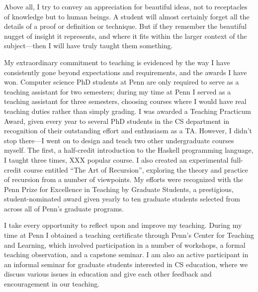 \documentclass{article}
\begin{document}

Above all, I try to convey an appreciation for beautiful ideas,
not to receptacles of knowledge but to human beings. A student will
almost certainly forget all the details of a proof or definition or
technique.  But if they remember the beautiful nugget of insight it
represents, and where it fits within the larger context of the
subject---then I will have truly taught them something.

% 

My extraordinary commitment to teaching is evidenced by the way I have
consistently gone beyond expectations and requirements, and the awards
I have won.  Computer science PhD students at Penn are only required
to serve as a teaching assistant for two semesters; during my time at
Penn I served as a teaching assistant for three semesters, choosing
courses where I would have real teaching duties rather than simply
grading.  I was awarded a Teaching Practicum Award, given every year
to several PhD students in the CS department in recognition of their
outstanding effort and enthusiasm as a TA.  However, I didn't stop
there---I went on to design and teach two other undergraduate courses
myself. The first, a half-credit introduction to the Haskell
programming language, I taught three times, XXX popular course.  I
also created an experimental full-credit course entitled ``The Art of
Recursion'', exploring the theory and practice of recursion from a
number of viewpoints.  My efforts were recognized with the Penn Prize
for Excellence in Teaching by Graduate Students, a prestigious,
student-nominated award given yearly to ten graduate students selected
from across all of Penn's graduate programs.

I take every opportunity to reflect upon and improve my
teaching. During my time at Penn I obtained a teaching certificate
through Penn's Center for Teaching and Learning, which involved
participation in a number of workshops, a formal teaching observation,
and a capstone seminar.  I am also an active participant in an
informal seminar for graduate students interested in CS education,
where we discuss various issues in education and give each other
feedback and encouragement in our teaching.
\end{document}

